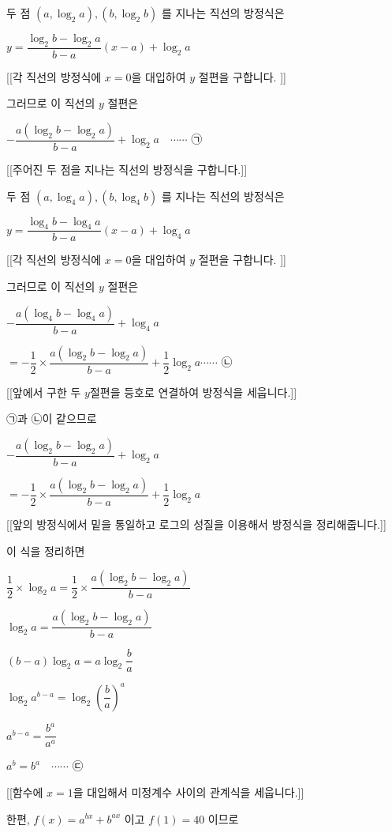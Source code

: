 \documentclass{oblivoir}
\begin{document}
두 점 $\left(a, \log _{2} a\right),\left(b, \log _{2} b\right)$ 를 지나는 직선의 방정식은

$y=\dfrac{\log _{2} b-\log _{2} a}{b-a}(x-a)+\log _{2} a $

[[각 직선의 방정식에 $x=0$을 대입하여 $y$ 절편을 구합니다. ]]

그러므로 이 직선의 $y$ 절편은

$-\dfrac{a\left(\log _{2} b-\log _{2} a\right)}{b-a}+\log _{2} a \quad \cdots \cdots$ ㉠

[[주어진 두 점을 지나는 직선의 방정식을 구합니다.]]

두 점 $\left(a, \log _{4} a\right),\left(b, \log _{4} b\right)$ 를 지나는 직선의 방정식은

$y=\dfrac{\log _{4} b-\log _{4} a}{b-a}(x-a)+\log _{4} a $

[[각 직선의 방정식에 $x=0$을 대입하여 $y$ 절편을 구합니다. ]]

그러므로 이 직선의 $y$ 절편은

$-\dfrac{a\left(\log _{4} b-\log _{4} a\right)}{b-a}+\log _{4} a$

$=-\dfrac{1}{2} \times \dfrac{a\left(\log _{2} b-\log _{2} a\right)}{b-a}+\dfrac{1}{2} \log _{2} a \cdots \cdots $ ㉡

[[앞에서 구한 두 $y$절편을 등호로 연결하여 방정식을 세웁니다.]]

㉠과 ㉡이 같으므로

$-\dfrac{a\left(\log _{2} b-\log _{2} a\right)}{b-a}+\log _{2} a$

$=-\dfrac{1}{2} \times \dfrac{a\left(\log _{2} b-\log _{2} a\right)}{b-a}+\dfrac{1}{2} \log _{2} a$

[[앞의 방정식에서 밑을 통일하고 로그의 성질을 이용해서 방정식을 정리해줍니다.]]

이 식을 정리하면

$\dfrac{1}{2} \times \log _{2} a=\dfrac{1}{2} \times \dfrac{a\left(\log _{2} b-\log _{2} a\right)}{b-a}$

$\log _{2} a=\dfrac{a\left(\log _{2} b-\log _{2} a\right)}{b-a}$

$(b-a) \log _{2} a=a \log _{2} \dfrac{b}{a}$

$\log _{2} a^{b-a}=\log _{2}\left(\dfrac{b}{a}\right)^{a}$

$a^{b-a}=\dfrac{b^{a}}{a^{a}}$

$a^{b}=b^{a} \quad \cdots \cdots$ ㉢

[[함수에 $x=1$을 대입해서 미정계수 사이의 관계식을 세웁니다.]]

한편, $f(x)=a^{b x}+b^{a x}$ 이고
$f(1)=40$ 이므로
\end{document}
